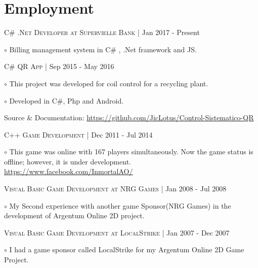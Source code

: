 \documentclass[letterpaper]{article}
\renewenvironment{itemize}{
  \begin{list}{}{
    \setlength{\leftmargin}{1.5em}
  }
}{
  \end{list}
}
\newenvironment{no-indent-itemize}{
  \begin{list}{}{
    \setlength{\leftmargin}{0em}
  }
}{
  \end{list}
}
\def\bullet{$\circ$\xspace}
\begin{document}
\section*{Employment}
\begin{no-indent-itemize}

    \item\textsc{C\# .Net Developer at Supervielle Bank} | Jan 2017 - Present
    \begin{itemize}
    \item\bullet Billing management system in C\# , .Net framework and JS.
    \end{itemize}
    
    \item \textsc{C\# QR App} | Sep 2015 - May 2016
    \begin{itemize} 
    \item\bullet 
    This project was developed for coil control for a recycling plant. 
    \item\bullet Developed in C\#, Php and Android. 
    \end{itemize}
    \begin{itemize}
    \item
    Source \& Documentation:
    \href{https://github.com/JicLotus/Control-Sistematico-QR}{https://github.com/JicLotus/Control-Sistematico-QR}
    \end{itemize}


    \item\textsc{C++ Game Development} | Dec 2011 - Jul 2014
    \begin{itemize} \item\bullet
    This game was online with 167 players simultaneously. Now the game status is offline; however, it is under development. \href{https://www.facebook.com/InmortalAO/}{https://www.facebook.com/InmortalAO/}
    \end{itemize}

    \item\textsc{Visual Basic Game Development at NRG Games} | Jan 2008 - Jul 2008 
    \begin{itemize} \item\bullet
    My Second experience with another game Sponsor(NRG Games) in the development of Argentum Online 2D project. 
    \end{itemize}

    \item \textsc{Visual Basic Game Development at LocalStrike} | Jan 2007 - Dec 2007
    \begin{itemize} \item\bullet
    I had a game sponsor called LocalStrike for my Argentum Online 2D Game Project.
    \end{itemize}

\end{no-indent-itemize}
\end{document}
